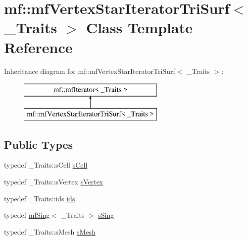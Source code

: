 \hypertarget{classmf_1_1mfVertexStarIteratorTriSurf}{
\section{mf::mfVertexStarIteratorTriSurf$<$ \_\-Traits $>$ Class Template Reference}
\label{classmf_1_1mfVertexStarIteratorTriSurf}
}
Inheritance diagram for mf::mfVertexStarIteratorTriSurf$<$ \_\-Traits $>$:\begin{figure}[H]
\begin{center}
\leavevmode
\includegraphics[height=2.000000cm]{classmf_1_1mfVertexStarIteratorTriSurf}
\end{center}
\end{figure}
\subsection*{Public Types}
\begin{DoxyCompactItemize}
\item 
typedef \_\-Traits::sCell \hyperlink{classmf_1_1mfVertexStarIteratorTriSurf_afe93e1a4572dfe24b7235db18ea90437}{sCell}
\item 
typedef \_\-Traits::sVertex \hyperlink{classmf_1_1mfVertexStarIteratorTriSurf_a2a1e281d8c7858e2e31d79a67d3884a3}{sVertex}
\item 
typedef \_\-Traits::ids \hyperlink{classmf_1_1mfVertexStarIteratorTriSurf_acd3a7e18747ad6cc0357bdd8fa366ac7}{ids}
\item 
typedef \hyperlink{classmf_1_1mfSing}{mfSing}$<$ \_\-Traits $>$ \hyperlink{classmf_1_1mfVertexStarIteratorTriSurf_a5fdb4a2a1f36e5069e68a1b0c6afdbd1}{sSing}
\item 
typedef \_\-Traits::sMesh \hyperlink{classmf_1_1mfVertexStarIteratorTriSurf_a6a0a8773d65d971e636d4361fb65b5af}{sMesh}
\end{DoxyCompactItemize}
